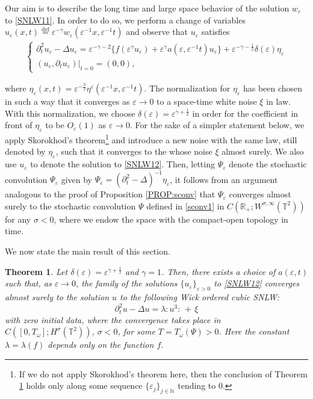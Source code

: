 \documentclass[letterpaper, 11pt,  reqno]{amsart}
\newtheorem{theorem}{Theorem} [section]
\newcommand{\1}{\hspace{0.5mm}\text{I}\hspace{0.5mm}}
\newcommand{\noi}{\noindent}
\newcommand{\R}{\mathbb{R}}
\newcommand{\T}{\mathbb{T}}
\newcommand{\Dl}{\Delta}
\newcommand{\eps}{\varepsilon}
\newcommand{\g}{\gamma}
\newcommand{\s}{\sigma}
\newcommand{\dt}{\partial_t}
\renewcommand{\o}{\omega}
\newcommand{\N}{\mathbb{N}}
\numberwithin{equation}{section}
\numberwithin{theorem}{section}
\begin{document}
Our aim is to describe the long time and large space behavior of
the solution $w_\eps$ to \eqref{SNLW11}.
 In order to do so,  we perform a change of variables
$u_{\eps} (x, t) \overset{\text{def}}{=} \eps^{- \g} w_\eps (\eps^{-1} x, \eps^{-1} t)$ 
and observe that $u_{\eps}$ satisfies
\begin{align}
\begin{cases}
 \dt^2 u_\eps - \Dl u_\eps
  = \eps^{- \gamma - 2} \big\{f
(\eps^{\gamma} u_{\eps}) + \eps^{\gamma} a
(\eps, \eps^{-1} t) u_{\eps}\big\} + \eps^{ - \g-\frac 12 } \delta
(\eps) \eta_{\eps}\\
(u_\eps, \dt u_\eps) |_{t = 0} = (0, 0),
\end{cases}
\label{SNLW12}
\end{align}


\noi
where $\eta_{\eps} (x, t) = \eps^{- \frac 3  2} \eta^\eps (\eps^{-1} x, \eps^{- 1} t)$. 
The normalization for $\eta_{\eps}$ has
been chosen in such a way that it converges as $\eps \rightarrow 0$
to a space-time white noise $\xi$ in law.
With this normalization, we  choose
$\delta (\eps) = \eps^{\g + \frac 1 2}$ in order for the
coefficient in front of $\eta_{\eps}$ to be $O_{\eps} (1)$ as
$\eps \rightarrow 0$.
For the sake of a simpler statement below, 
we apply Skorokhod's theorem\footnote{If we do not apply
Skorokhod's theorem here, then the conclusion of Theorem \ref{THM:2} 
holds only along some sequence $\{\eps_j\}_{j \in \N}$ tending to 0.}
and introduce a new noise with the same law, still denoted by $\eta_\eps$,
such that it converges to the whose noise $\xi$ 
almost surely.
We also use $u_\eps$ to denote the solution to \eqref{SNLW12}.
Then, letting $\Psi_\eps$ denote the  stochastic convolution $\Psi_\eps$ 
given by  $\Psi_{\eps} = (\dt^2 - \Dl)^{-1} \eta_\eps$, 
it follows from an argument analogous to the proof of Proposition \ref{PROP:sconv}
that $\Psi_\eps$ converges almost surely to the stochastic convolution $\Psi$ defined in \eqref{sconv1}
 in $C(\R_+; W^{\s, \infty}(\T^2))$ for any $\s <0$,
where we endow the space with the compact-open topology in time.

We now state the  main result of this section.

\begin{theorem}\label{THM:2}
  Let $\delta (\eps) = \eps^{\g + \frac 12}$ and $\gamma = 1$.
 Then,  there exists a choice of $a (\eps, t)$ such that, as $\eps \to 0$, 
 the family of 
the solutions   $\{u_{\eps}\}_{\eps>0}$ to \eqref{SNLW12} converges 
almost surely 
 to  the solution $u$ to the following  Wick ordered cubic SNLW:
  \begin{equation}
\dt^2 u - \Dl  u = \lambda : \!u^3 \!: \, + \, \xi
    \label{SNLW_ld}
  \end{equation}
  with zero initial data,
where the convergence takes place  
in $C([0, T_\o]; H^\s(\T^2))$, $\s < 0$,  for some  $T = T_\o(\Psi)>0$.
   Here the constant $\lambda = \lambda (f)$
  depends only on the function $f$.

\end{theorem}
\end{document}
